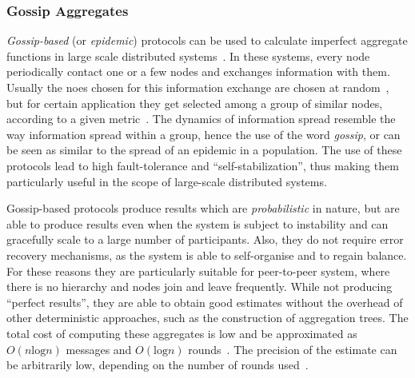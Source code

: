 
\subsubsection*{Gossip Aggregates}

\emph{Gossip-based} (or \emph{epidemic}) protocols can be used to calculate imperfect aggregate functions in large scale
distributed systems~\cite{gossip-aggregates, gossip-aggregates-large}. In these systems, every node periodically contact 
one or a few nodes and exchanges information with them. Usually the noes chosen for this information exchange are
chosen at random~\cite{cyclon}, but for certain application they get selected among a group of similar nodes, according
to a given metric~\cite{vicinity}. The dynamics of information spread resemble the way information spread within a
group, hence the use of the word \emph{gossip}, or can be seen as similar to the spread of an epidemic in a population. 
The use of these protocols lead to high fault-tolerance and ``self-stabilization'', thus making them particularly useful
in the scope of large-scale distributed systems. 

Gossip-based protocols produce results which are \emph{probabilistic} in nature, but are able to produce results even
when the system is subject to instability and can gracefully scale to a large number of participants. Also, they do not
require error recovery mechanisms, as the system is able to self-organise and to regain balance. For these reasons they
are particularly suitable for peer-to-peer system, where there is no hierarchy and nodes join and leave frequently.
While not producing ``perfect results'', they are able to obtain good estimates without the overhead of other
deterministic approaches, such as the construction of aggregation trees. The total cost of computing these aggregates
is low and be approximated as $O(n\mathrm{log}n)$ messages and $O(\mathrm{log}n)$
rounds~\cite{gossip-aggregates-opt}. The precision of the estimate can be arbitrarily low, depending on the number of
rounds used~\cite{gossip-aggregates-large}.

